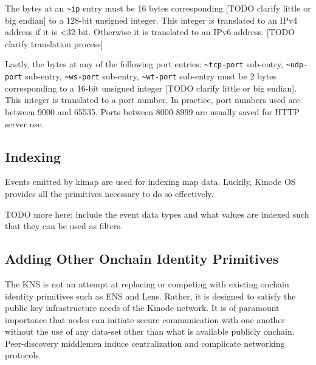 \documentclass[runningheads]{llncs}
\begin{document}
The bytes at an \verb|~ip| entry must be 16 bytes corresponding [TODO clarify little or big endian] to a 128-bit unsigned integer.
This integer is translated to an IPv4 address if it is <32-bit.
Otherwise it is translated to an IPv6 address. [TODO clarify translation process]

Lastly, the bytes at any of the following port entries: \verb|~tcp-port| sub-entry, \verb|~udp-port| sub-entry, \verb|~ws-port| sub-entry, \verb|~wt-port| sub-entry must be 2 bytes corresponding to a 16-bit unsigned integer [TODO clarify little or big endian].
This integer is translated to a port number.
In practice, port numbers used are between 9000 and 65535.
Ports between 8000-8999 are usually saved for HTTP server use.

\subsection{Indexing}

Events emitted by kimap are used for indexing map data.
Luckily, Kinode OS provides all the primitives necessary to do so effectively.

TODO more here: include the event data types and what values are indexed such that they can be used as filters.

\subsection{Adding Other Onchain Identity Primitives}

The KNS is not an attempt at replacing or competing with existing onchain identity primitives such as ENS and Lens.
Rather, it is designed to satisfy the public key infrastructure needs of the Kinode network.
It is of paramount importance that nodes can initiate secure communication with one another without the use of any data-set other than what is available publicly onchain.
Peer-discovery middlemen induce centralization and complicate networking protocols.
\end{document}
